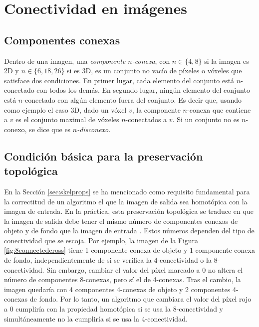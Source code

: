 \section{Conectividad en imágenes}

\subsection{Componentes conexas}

Dentro de una imagen, una \textit{componente $n$-conexa}, con $n \in \{4, 8\}$ si la imagen es 2D y $n \in \{6, 18, 26\}$ si es 3D, es un conjunto no vacío de píxeles o vóxeles que satisface dos condiciones. En primer lugar, cada elemento del conjunto está $n$-conectado con todos los demás. En segundo lugar, ningún elemento del conjunto está $n$-conectado con algún elemento fuera del conjunto. Es decir que, usando como ejemplo el caso 3D, dado un vóxel $v$, la componente $n$-conexa que contiene a $v$ es el conjunto maximal de vóxeles $n$-conectados a $v$. Si un conjunto no es $n$-conexo, se dice que es \textit{$n$-disconexo}.

\subsection{Condición básica para la preservación topológica} \label{ssec:fakehomotopy}

En la Sección \ref{sec:skelprops} se ha mencionado como requisito fundamental para la correctitud de un algoritmo el que la imagen de salida sea homotópica con la imagen de entrada. En la práctica, esta preservación topológica se traduce en que la imagen de salida debe tener el mismo número de componentes conexas de objeto y de fondo que la imagen de entrada \cite{saha1994topology}. Estos números dependen del tipo de conectividad que se escoja. Por ejemplo, la imagen de la Figura \ref{fig:8connectedcross} tiene 1 componente conexa de objeto y 1 componente conexa de fondo, independientemente de si se verifica la 4-conectividad o la 8-conectividad. Sin embargo, cambiar el valor del píxel marcado a 0 no altera el número de componentes 8-conexas, pero sí el de 4-conexas. Tras el cambio, la imagen quedaría con 4 componentes 4-conexas de objeto y 2 componentes 4-conexas de fondo. Por lo tanto, un algoritmo que cambiara el valor del píxel rojo a 0 cumpliría con la propiedad homotópica si se usa la 8-conectividad y simultáneamente no la cumpliría si se usa la 4-conectividad.

